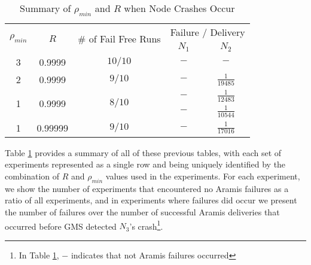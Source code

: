     \begin{table}[h]
  \begin{center}
  \renewcommand{\arraystretch}{1.5}
    \begin{tabular}{|c|c|c|c|c|}
    \hline
    \multirow{2}{*}{$\rho_{min}$} & \multirow{2}{*}{$R$}    & \multirow{2}{1.75cm}{$\#$ of Fail Free Runs} & \multicolumn{2}{|c|}{Failure / Delivery} \\ \cline{4-5}
                                 &              &                   & $N_1$   & $N_2$             \\ \hline \hline
    3                           & 0.9999  & $10/10$    & $-$        & $-$                 \\ \hline
    2                           & 0.9999  & $9/10$      & $-$        & $\frac{1}{19485}$ \\ \hline
    \multirow{2}{*}{1} & \multirow{2}{*}{0.9999} & \multirow{2}{*}{$8/10$} & $-$ & $\frac{1}{12483}$ \\ 
                                 &              &                   & $-$        & $\frac{1}{10544}$ \\ \hline
    1                           &0.99999 & $9/10$      & $-$        & $\frac{1}{17016}$ \\ \hline
    \end{tabular}
    \caption{Summary of $\rho_{min}$ and $R$ when Node Crashes Occur}
    \label{table:crashed_node_summary}
  \end{center}
\end{table}    
    
    Table \ref{table:crashed_node_summary} provides a summary of all of these previous tables, with each set of experiments represented as a single row and being uniquely identified by the combination of $R$ and $\rho_{min}$ values used in the experiments.  For each experiment, we show the number of experiments that encountered no \textsf{Aramis} failures as a ratio of all experiments, and in experiments where failures did occur we present the number of failures over the number of successful \textsf{Aramis} deliveries that occurred before GMS detected $N_3$'s crash\footnote{In Table \ref{table:crashed_node_summary}, $-$ indicates that not \textsf{Aramis} failures occurred}.  
     
